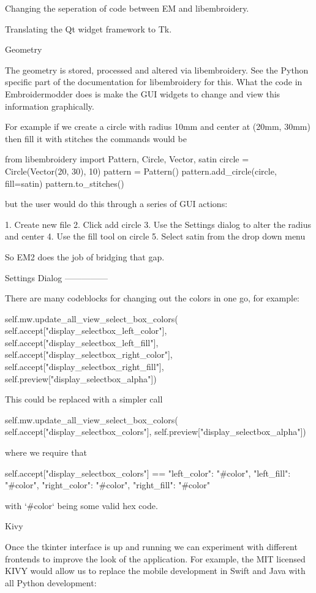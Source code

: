 \documentclass[a4paper]{report}
\begin{document}
{{Changing the seperation of code between EM and libembroidery.

Translating the Qt widget framework to Tk.

Geometry
~~~~~~~~

The geometry is stored, processed and altered via libembroidery. See the Python specific part of the documentation for libembroidery for this. What the code in Embroidermodder does is make the GUI widgets to change and view this information graphically.

For example if we create a circle with radius 10mm and center at (20mm, 30mm) then fill it with stitches the commands would be

    from libembroidery import Pattern, Circle, Vector, satin
    circle = Circle(Vector(20, 30), 10)
    pattern = Pattern()
    pattern.add_circle(circle, fill=satin)
    pattern.to_stitches()

but the user would do this through a series of GUI actions:

1. Create new file
2. Click add circle
3. Use the Settings dialog to alter the radius and center
4. Use the fill tool on circle
5. Select satin from the drop down menu

So EM2 does the job of bridging that gap.

Settings Dialog
---------------

There are many codeblocks for changing out the colors in one go, for example:

    self.mw.update_all_view_select_box_colors(    self.accept["display_selectbox_left_color"],
    self.accept["display_selectbox_left_fill"],
    self.accept["display_selectbox_right_color"],
    self.accept["display_selectbox_right_fill"],
    self.preview["display_selectbox_alpha"])

This could be replaced with a simpler call

    self.mw.update_all_view_select_box_colors(
    self.accept["display_selectbox_colors"],
    self.preview["display_selectbox_alpha"])

where we require that

    self.accept["display_selectbox_colors"] == {
    "left_color": "#color",
    "left_fill": "#color",
    "right_color": "#color",
    "right_fill": "#color"
    }

with `\#color` being some valid hex code.

Kivy
~~~~

Once the tkinter interface is up and running we can experiment
with different frontends to improve the look of the application.
For example, the MIT licensed KIVY would allow us to replace the 
mobile development in Swift and Java with all Python development:

}}
\end{document}
